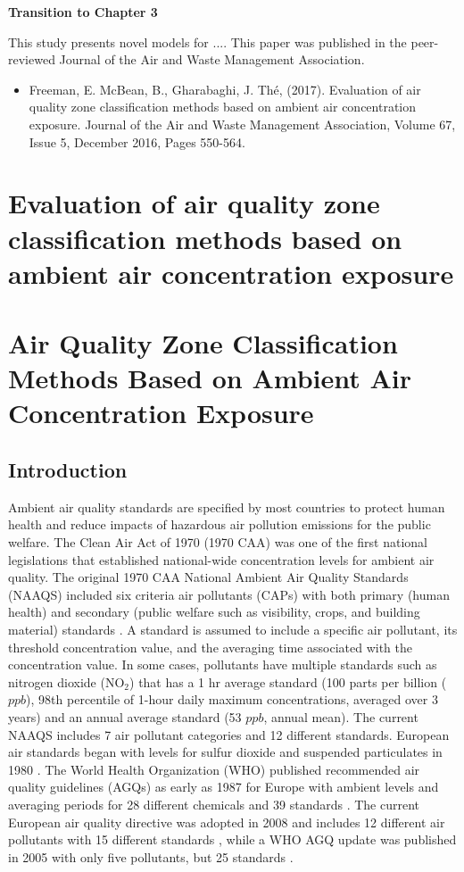 \noindent\textbf{Transition to Chapter 3}

This study presents novel models for .... This paper was published in the peer-reviewed Journal of the Air and Waste Management Association.

\begin{itemize}
\item Freeman, E. McBean, B., Gharabaghi, J.  Th\'e, (2017). Evaluation of air quality zone classification methods based on ambient air concentration exposure. Journal of the Air and Waste Management Association, Volume 67, Issue 5, December 2016, Pages 550-564.
\end{itemize}
\chapter{Evaluation of air quality zone classification methods based on ambient air concentration exposure}

\chapter{Air Quality Zone Classification Methods Based on Ambient Air Concentration Exposure}

\section{Introduction}

Ambient air quality standards are specified by most countries to protect human health and reduce impacts of hazardous air pollution emissions for the public welfare. The Clean Air Act of 1970 (1970 CAA) was one of the first national legislations that established national-wide concentration levels for ambient air quality.  The original 1970 CAA National Ambient Air Quality Standards (NAAQS) included six criteria air pollutants (CAPs) with both primary (human health) and secondary (public welfare such as visibility, crops, and building material) standards \citep{USEPA1970}. A standard is assumed to include a specific air pollutant, its threshold concentration value, and the averaging time associated with the concentration value. In some cases, pollutants have multiple standards such as nitrogen dioxide (NO$_{2}$) that has a 1 hr average standard (100 parts per billion ($ppb$), 98th percentile of 1-hour daily maximum concentrations, averaged over 3 years) and an annual average standard (53 $ppb $, annual mean). The current NAAQS includes 7 air pollutant categories and 12 different standards. European air standards began with levels for sulfur dioxide and suspended particulates in 1980 \citep{EEC1980}. The World Health Organization (WHO) published recommended air quality guidelines (AGQs) as early as 1987 for Europe with ambient levels and averaging periods for 28 different chemicals and 39 standards \citep{Lubkert1994}. The current European air quality directive was adopted in 2008 and includes 12 different air pollutants with 15 different standards \citep{EU2008}, while a WHO AGQ update was published in 2005 with only five pollutants, but 25 standards \citep{WHO2006}. 

